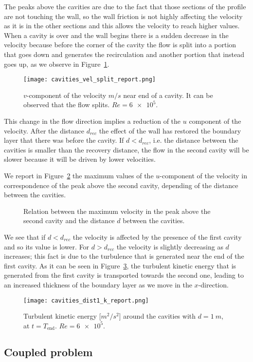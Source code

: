 The peaks above the cavities are due to the fact that those sections of the profile are not 
touching the wall, so the wall friction is not highly affecting the velocity as it is
in the other sections and this allows the velocity to reach higher values.
When a cavity is over and the wall begins there is a sudden decrease in the 
velocity because before the corner of the cavity the flow is split into a 
portion that goes down and generates the recirculation and another portion that 
instead goes up, as we observe in Figure~\ref{fig:vel_split}.
\begin{figure}
	\centering
	\texttt{[image: cavities\_vel\_split\_report.png]}
	\caption[$v$-component of the velocity near end of a cavity in the cavities problem]{$v$-component of the velocity $\si{m/s}$ near end of a cavity. It can be observed that the flow splits. $Re = \num{6e5}$.}
	\label{fig:vel_split}
\end{figure}
This change in the flow direction implies a reduction of the $u$ component of the velocity. After the 
distance $d_{rec}$ the effect of the wall has restored the boundary layer that 
there was before the cavity. If $d < d_{rec}$, i.e. the distance between the 
cavities is smaller than the recovery distance, the flow in the second 
cavity will be slower because it will be driven by lower velocities.

We report in Figure~\ref{fig:velpeaks} the maximum values of the $u$-component 
of the velocity in correspondence of the peak above the second cavity, depending 
of the distance between the cavities.
\begin{figure}
	\centering
	
	\caption[Relation between the maximum velocity above the second cavity and 
	the distance between the cavities]{Relation between the maximum velocity in the peak above the second cavity and the distance $d$ between the cavities.}
	\label{fig:velpeaks}
\end{figure}
We see that if $d < d_{rec}$ the velocity is affected by the presence of 
the first cavity and so its value is lower. For $d>d_{rec}$ the velocity is 
slightly decreasing as $d$ increases; this fact is due to the turbulence that 
is generated near the end of the first cavity. As it can be seen in 
Figure~\ref{fig:kd1}, the turbulent kinetic energy that is generated from the 
first cavity is transported towards the second one, leading to an increased 
thickness of the boundary layer as we move in the $x$-direction.
\begin{figure}
	\centering
	\texttt{[image: cavities\_dist1\_k\_report.png]}
	\caption[Turbulen kinetic energy in the cavities problem]{Turbulent kinetic energy [$\si{m^2/s^2}$] around the cavities with $d=\SI{1}{m}$, at $t=T_\text{end}$. $Re=\num{6e5}$.}
	\label{fig:kd1}
\end{figure}
%
\subsection{Coupled problem}
